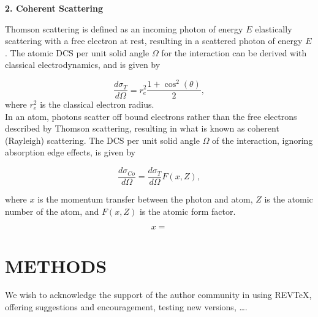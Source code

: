 \documentclass[%
 aip,
cp,  %
 amsmath,amssymb,%
reprint,%
]{revtex4-2}
\begin{document}
\begin{large}
    \bf{2. Coherent Scattering}
\end{large}

\par Thomson scattering is defined as an incoming photon of energy $E$ elastically scattering with a free electron at rest, resulting in a scattered photon of energy $E$. The atomic DCS per unit solid angle $\Omega$ for the interaction can be derived with classical electrodynamics, and is given by

\begin{equation}
    \frac{d\sigma_T}{d\Omega} = r_e^2 \frac{1 + \cos^2(\theta)}{2},
\end{equation}
where $r_e^2$ is the classical electron radius. \\
In an atom, photons scatter off bound electrons rather than the free electrons described by Thomson scattering, resulting in what is known as coherent (Rayleigh) scattering. The DCS per unit solid angle $\Omega$ of the interaction, ignoring absorption edge effects, is given by

\begin{equation}
    \frac{d\sigma_{Co}}{d\Omega} = \frac{d\sigma_T}{d\Omega} F(x, Z),
\end{equation}

where $x$ is the momentum transfer between the photon and atom, $Z$ is the atomic number of the atom, and $F(x, Z)$ is the atomic form factor.


\begin{equation}
    x = 
\end{equation}



\section{METHODS}





\begin{acknowledgments}
We wish to acknowledge the support of the author community in using
REV\TeX{}, offering suggestions and encouragement, testing new versions,
\dots.
\end{acknowledgments}

\nocite{*}

\end{document}
